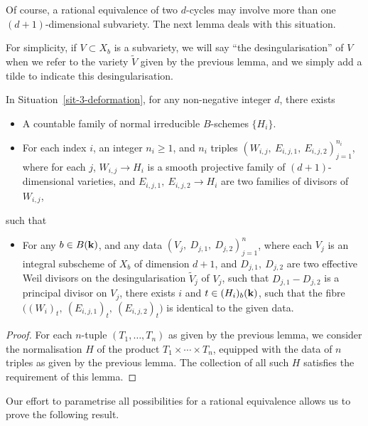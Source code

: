 Of course, a rational equivalence of two $d$-cycles may involve
more than one $(d+1)$-dimensional subvariety.
The next lemma deals with this situation.

For simplicity, if $V \subset X_b$ is a subvariety,
we will say ``the desingularisation'' of $V$
when we refer to the variety $\widetilde{V}$ given by the previous lemma,
and we simply add a tilde to indicate this desingularisation.

\begin{lemma} \label{lem-3-divisors}
    In Situation~\textup{\ref{sit-3-deformation}}, for any non-negative integer $d$, there exists
    \begin{itemize}
        \item
            A countable family of normal irreducible $B$-schemes $\{ H_i \}$.
        \item
            For each index $i$, an integer $n_i \geq 1$,
            and $n_i$ triples $(W_{i,j},\ E_{i,j,1},\ E_{i,j,2})_{j=1}^{n_i}$,
            where for each $j$, $W_{i,j} \to H_i$ is a smooth projective family of $(d+1)$-dimensional varieties,
            and $E_{i,j,1},\ E_{i,j,2} \to H_i$ are two families of divisors of~$W_{i,j}$,
    \end{itemize}
    such that
    \begin{itemize}
        \item
            For any $b \in B(\bbk)$, and any data $(V_j,\ D_{j,1},\ D_{j,2})_{j=1}^n$,
            where each $V_j$ is an integral subscheme of $X_b$ of dimension $d+1$,
            and $D_{j,1},\ D_{j,2}$ are two effective Weil divisors on 
            the desingularisation $\widetilde{V}_j$ of $V_j$, 
            such that $D_{j,1} - D_{j,2}$ is a principal divisor on $V_j$, 
            there exists $i$ and $t \in (H_i)_b (\bbk)$, 
            such that the fibre $\bigl( (W_i)_t,\ (E_{i,j,1})_t,\ (E_{i,j,2})_t \bigr)$ 
            is identical to the given data.
    \end{itemize}
\end{lemma}

\begin{proof}
    For each $n$-tuple $(T_1, \dotsc, T_n)$ as given by the previous lemma,
    we consider the normalisation $H$ of the product $T_1 \times \cdots \times T_n$,
    equipped with the data of $n$ triples as given by the previous lemma.
    The collection of all such $H$ satisfies the requirement of this lemma.
\end{proof}

Our effort to parametrise all possibilities for a rational equivalence
allows us to prove the following result.

